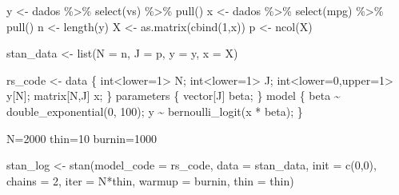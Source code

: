 \documentclass[
]{book}
\newenvironment{Shaded}{\begin{snugshade}}{\end{snugshade}}
\newcommand{\AttributeTok}[1]{\textcolor[rgb]{0.77,0.63,0.00}{#1}}
\newcommand{\DecValTok}[1]{\textcolor[rgb]{0.00,0.00,0.81}{#1}}
\newcommand{\FunctionTok}[1]{\textcolor[rgb]{0.00,0.00,0.00}{#1}}
\newcommand{\NormalTok}[1]{#1}
\newcommand{\OtherTok}[1]{\textcolor[rgb]{0.56,0.35,0.01}{#1}}
\newcommand{\SpecialCharTok}[1]{\textcolor[rgb]{0.00,0.00,0.00}{#1}}
\newcommand{\StringTok}[1]{\textcolor[rgb]{0.31,0.60,0.02}{#1}}
\begin{document}
\begin{Shaded}
\begin{Highlighting}[]
\NormalTok{y }\OtherTok{\textless{}{-}}\NormalTok{ dados }\SpecialCharTok{\%\textgreater{}\%} \FunctionTok{select}\NormalTok{(vs) }\SpecialCharTok{\%\textgreater{}\%} \FunctionTok{pull}\NormalTok{()}
\NormalTok{x }\OtherTok{\textless{}{-}}\NormalTok{ dados }\SpecialCharTok{\%\textgreater{}\%} \FunctionTok{select}\NormalTok{(mpg) }\SpecialCharTok{\%\textgreater{}\%} \FunctionTok{pull}\NormalTok{()}
\NormalTok{n }\OtherTok{\textless{}{-}} \FunctionTok{length}\NormalTok{(y)}
\NormalTok{X }\OtherTok{\textless{}{-}} \FunctionTok{as.matrix}\NormalTok{(}\FunctionTok{cbind}\NormalTok{(}\DecValTok{1}\NormalTok{,x))}
\NormalTok{p }\OtherTok{\textless{}{-}} \FunctionTok{ncol}\NormalTok{(X)}

\NormalTok{stan\_data }\OtherTok{\textless{}{-}} \FunctionTok{list}\NormalTok{(}\AttributeTok{N =}\NormalTok{ n, }\AttributeTok{J =}\NormalTok{ p, }\AttributeTok{y =}\NormalTok{ y, }\AttributeTok{x =}\NormalTok{ X)}

\NormalTok{rs\_code }\OtherTok{\textless{}{-}} \StringTok{\textquotesingle{}}
\StringTok{  data \{}
\StringTok{    int\textless{}lower=1\textgreater{} N;}
\StringTok{    int\textless{}lower=1\textgreater{} J;}
\StringTok{    int\textless{}lower=0,upper=1\textgreater{} y[N];}
\StringTok{    matrix[N,J] x;}
\StringTok{  \}}
\StringTok{  parameters \{}
\StringTok{    vector[J] beta;}
\StringTok{  \}}
\StringTok{  model \{}
\StringTok{    beta \textasciitilde{} double\_exponential(0, 100);}
\StringTok{    y \textasciitilde{} bernoulli\_logit(x * beta);}
\StringTok{  \}\textquotesingle{}}

\NormalTok{N}\OtherTok{=}\DecValTok{2000}
\NormalTok{thin}\OtherTok{=}\DecValTok{10}
\NormalTok{burnin}\OtherTok{=}\DecValTok{1000}

\NormalTok{stan\_log }\OtherTok{\textless{}{-}} \FunctionTok{stan}\NormalTok{(}\AttributeTok{model\_code =}\NormalTok{ rs\_code, }\AttributeTok{data =}\NormalTok{ stan\_data, }\AttributeTok{init =} \FunctionTok{c}\NormalTok{(}\DecValTok{0}\NormalTok{,}\DecValTok{0}\NormalTok{),}
  \AttributeTok{chains =} \DecValTok{2}\NormalTok{, }\AttributeTok{iter =}\NormalTok{ N}\SpecialCharTok{*}\NormalTok{thin, }\AttributeTok{warmup =}\NormalTok{ burnin, }\AttributeTok{thin =}\NormalTok{ thin)}
\end{Highlighting}
\end{Shaded}
\end{document}
